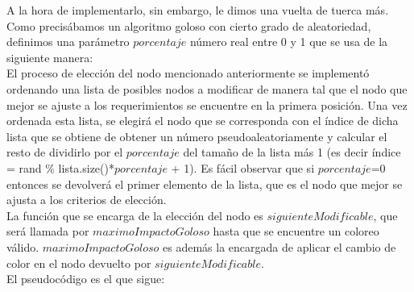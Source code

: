 \indent A la hora de implementarlo, sin embargo, le dimos una vuelta de tuerca más. Como precisábamos un algoritmo goloso con cierto grado de aleatoriedad, definimos una parámetro $porcentaje$  número real entre 0 y 1 que se usa de la siguiente manera:\\
\indent El proceso de elección del nodo mencionado anteriormente se implementó ordenando una lista de posibles nodos a modificar de manera tal que el nodo que mejor se ajuste a los requerimientos se encuentre en la primera posición. Una vez ordenada esta lista, se elegirá el nodo que se corresponda con el índice de dicha lista que se obtiene de obtener un número pseudoaleatoriamente y calcular el resto de dividirlo por el $porcentaje$ del tamaño de la lista más 1 (es decir índice = rand \% lista.size()*$porcentaje$ + 1). Es fácil observar que si $porcentaje$=0 entonces se devolverá el primer elemento de la lista, que es el nodo que mejor se ajusta a los criterios de elección. \\

\indent La función que se encarga de la elección del nodo es $siguienteModificable$, que será llamada por $maximoImpactoGoloso$ hasta que se encuentre un coloreo válido. $maximoImpactoGoloso$ es además la encargada de aplicar el cambio de color en el nodo devuelto por $siguienteModificable$.\\

\indent El pseudocódigo es el que sigue:\\











